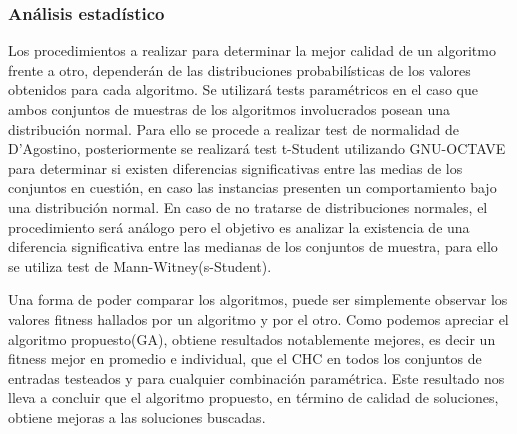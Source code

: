 \documentclass[journal]{IEEEtran}
\begin{document}
\subsubsection{Análisis estadístico}
Los procedimientos a realizar para determinar la mejor calidad de un algoritmo frente a otro, dependerán de las distribuciones probabilísticas de los valores obtenidos para cada algoritmo.
Se utilizará tests paramétricos en el caso que ambos conjuntos de muestras de los algoritmos involucrados posean una distribución normal. Para ello se procede a realizar test de normalidad de D'Agostino, posteriormente se realizará test t-Student utilizando GNU-OCTAVE \cite{url:octave} para determinar si existen diferencias significativas entre las medias de los conjuntos en cuestión, en caso las instancias presenten un comportamiento bajo una distribución normal.
En caso de no tratarse de distribuciones normales, el procedimiento será análogo pero el objetivo es analizar la existencia de una diferencia significativa entre las medianas de los conjuntos de muestra, para ello se utiliza test de Mann-Witney(s-Student).

Una forma de poder comparar los algoritmos, puede ser simplemente observar los valores fitness hallados por un algoritmo y por el otro. Como podemos apreciar el algoritmo propuesto(GA), obtiene resultados notablemente mejores, es decir un fitness mejor en promedio e individual, que el CHC en todos los conjuntos de entradas testeados y para cualquier combinación paramétrica. Este resultado nos lleva a concluir que el algoritmo propuesto, en término de calidad de soluciones, obtiene mejoras a las soluciones buscadas.
\end{document}

